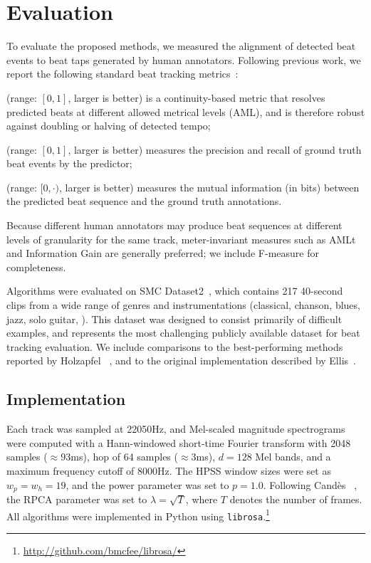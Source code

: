 \documentclass{article}
\begin{document}
\section{Evaluation}
\label{sec:eval}

To evaluate the proposed methods, we measured the alignment of detected beat events to 
beat taps generated by human annotators.  Following previous work, we report the
following standard beat tracking metrics~\cite{davies2009evaluation}:
\begin{description}\addtolength{\itemsep}{-.75\baselineskip}
\item[AMLt] (range: $[0, 1]$, larger is better) is a continuity-based metric that
resolves predicted beats at different allowed metrical levels (AML), and is therefore 
robust against doubling or halving of detected tempo;
\item[F-measure] (range: $[0,1]$, larger is better) measures the precision and recall of ground truth beat events by the predictor; 
\item[Information gain] (range: $[0, \cdot)$, larger is better) measures the mutual information (in bits) between the predicted beat sequence and the ground truth annotations.
\end{description}
Because different human annotators may produce beat sequences at
different levels of granularity for the same track, meter-invariant measures such as
AMLt and Information Gain are generally preferred; we include F-measure for
completeness.

Algorithms were evaluated on SMC Dataset2~\cite{holzapfel2012}, which contains 217
40-second clips from a wide range of genres and instrumentations (classical, chanson, 
blues, jazz, solo guitar, \etc).  This dataset was designed to consist primarily of 
difficult examples, and represents the most challenging publicly available dataset for beat
tracking evaluation.  We include comparisons to the best-performing methods reported by
Holzapfel \etal~\cite{holzapfel2012}, and to the original implementation described by
Ellis~\cite{ellis2007beat}.

\subsection{Implementation}
Each track was sampled at 22050Hz, and Mel-scaled magnitude spectrograms were computed 
with a Hann-windowed short-time Fourier transform with 2048 samples ($\approx93$ms), hop 
of 64 samples ($\approx3$ms), $d=128$ Mel bands, and a maximum frequency cutoff of 8000Hz.
The HPSS window sizes were set as $w_p = w_h = 19$, and the power parameter was set 
to $p=1.0$.
Following Cand\`{e}s \etal~\cite{candes2011robust}, the RPCA parameter was set to
${\lambda = \sqrt{T}}$, where $T$ denotes the number of frames.
All algorithms were implemented in Python using \texttt{librosa}.\footnote{\url{http://github.com/bmcfee/librosa/}}
\end{document}
